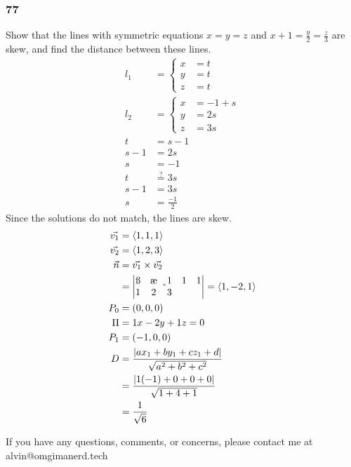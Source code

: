 \documentclass[letterpaper, 12pt]{math}
\begin{document}
\subsubsection*{77}
Show that the lines with symmetric equations \( x = y = z \) and
\( x+1 = \frac{y}{2} = \frac{z}{3} \) are skew, and find the distance
between these lines.
\begin{align*}
  l_1 &= \begin{cases}
    x &= t \\
    y &= t \\
    z &= t
  \end{cases} \\
  l_2 &= \begin{cases}
    x &= -1+s \\
    y &= 2s \\
    z &= 3s
  \end{cases} \\
  t &= s-1 \\
  s-1 &= 2s \\
  s &= -1 \\
  t &\stackrel{?}{=} 3s \\
  s-1 &= 3s \\
  s &= \frac{-1}{2}
\end{align*}
Since the solutions do not match, the lines are skew.
\begin{align*}
  \vec{v_1} &= \langle1,1,1\rangle \\
  \vec{v_2} &= \langle1,2,3\rangle \\
  \vec{n} &= \vec{v_1}\times\vec{v_2} \\
  &= \begin{vmatrix}
    \i & \j & \k \\
    1 & 1 & 1 \\
    1 & 2 & 3
  \end{vmatrix} = \langle1,-2,1\rangle \\
  P_0 &= (0,0,0) \\
  \Pi &= 1x-2y+1z = 0 \\
  P_1 &= (-1,0,0) \\
  D &= \frac{|ax_1+by_1+cz_1+d|}{\sqrt{a^2+b^2+c^2}} \\
  &= \frac{|1(-1)+0+0+0|}{\sqrt{1+4+1}} \\
  &= \frac{1}{\sqrt{6}}
\end{align*}

\begin{center}
  If you have any questions, comments, or concerns, please contact me at
  alvin@omgimanerd.tech
\end{center}
\end{document}
